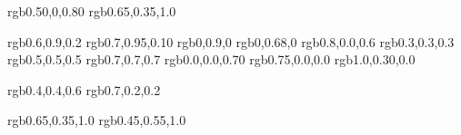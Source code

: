 

\usepackage{color}
\usepackage{xcolor}
\definecolor{darkpurple}  {rgb}{0.50,0,0.80}      %
\definecolor{purple}      {rgb}{0.65,0.35,1.0}    %

\definecolor{spring}    {rgb}{0.6,0.9,0.2}    %
\definecolor{lime}      {rgb}{0.7,0.95,0.10}  %
\definecolor{fluorescentgreen}   {rgb}{0,0.9,0}        %
\definecolor{green}     {rgb}{0,0.68,0}       %
\definecolor{magenta}   {rgb}{0.8,0.0,0.6}    %
\definecolor{dgrey}     {rgb}{0.3,0.3,0.3}    %
\definecolor{grey}      {rgb}{0.5,0.5,0.5}    %
\definecolor{lgrey}     {rgb}{0.7,0.7,0.7}    %
\definecolor{darkblue}  {rgb}{0.0,0.0,0.70}   %
\definecolor{darkred}   {rgb}{0.75,0.0,0.0}   %
\definecolor{orangered} {rgb}{1.0,0.30,0.0}   %





\definecolor{oldcolor}   {rgb}{0.4,0.4,0.6}  %
\definecolor{usedcolor}  {rgb}{0.7,0.2,0.2}  %

\definecolor{jb}             {rgb}{0.65,0.35,1.0}   %
\definecolor{jbn}            {rgb}{0.45,0.55,1.0}   %

